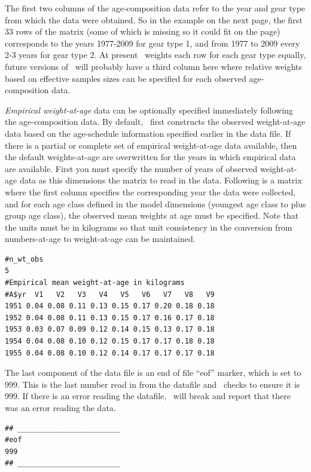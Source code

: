 \begin{multicols}{2}
The first two columns of the age-composition data refer to the year and gear type from which the data were obtained.  So in the example on the next page, the first 33 rows of the matrix (some of which is missing so it could fit on the page) corresponds to the years 1977-2009 for gear type 1, and from 1977 to 2009 every 2-3 years for gear type 2.  At present \iscam\ weights each row for each gear type equally, future versions of \iscam\ will probably have a third column here where relative weights based on effective samples sizes can be specified for each observed age-composition data.

\emph{Empirical weight-at-age} data can be optionally specified immediately following the age-composition data.  By default, \iscam\ first constructs the observed weight-at-age data based on the age-schedule information specified earlier in the data file.  If there is a partial or complete set of empirical weight-at-age data available, then the default weights-at-age are overwritten for the years in which empirical data are available.    First you must specify the number of years of observed weight-at-age data as this dimensions the matrix to read in the data.  Following is a matrix where the first column specifies the corresponding year the data were collected, and for each age class defined in the model dimensions (youngest age class to plus group age class), the observed mean weights at age must be specified.  Note that the units must be in kilograms so that unit consistency in the conversion from numbers-at-age to weight-at-age can be maintained.
\begin{footnotesize}
\begin{verbatim}
#n_wt_obs
5
#Empirical mean weight-at-age in kilograms 
#A$yr  V1   V2   V3   V4   V5   V6   V7   V8   V9
1951 0.04 0.08 0.11 0.13 0.15 0.17 0.20 0.18 0.18
1952 0.04 0.08 0.11 0.13 0.15 0.17 0.16 0.17 0.18
1953 0.03 0.07 0.09 0.12 0.14 0.15 0.13 0.17 0.18
1954 0.04 0.08 0.10 0.12 0.15 0.17 0.17 0.18 0.18
1955 0.04 0.08 0.10 0.12 0.14 0.17 0.17 0.17 0.18
\end{verbatim}
\end{footnotesize}


The last component of the data file is an end of file ``eof'' marker, which is set to 999.  This is the last number read in from the datafile and \iscam\ checks to ensure it is 999.  If there is an error reading the datafile, \iscam\ will break and report that there was an error reading the data.


\begin{verbatim}
## ________________________
#eof
999
## ________________________
\end{verbatim}

\end{multicols}
